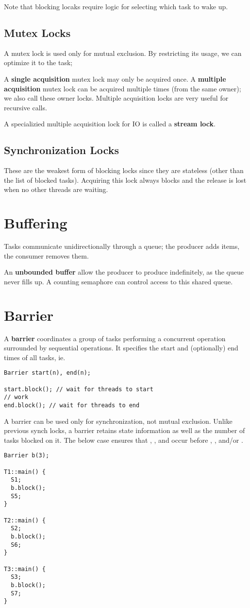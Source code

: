 \documentclass[12pt]{article}
\begin{document}
Note that blocking locaks require logic for selecting which task to wake up.

\subsection{Mutex Locks}
A mutex lock is used only for mutual exclusion. By restricting its usage, we can optimize it to the task;

A {\bf single acquisition} mutex lock may only be acquired once. A {\bf multiple acquisition} mutex lock can be acquired multiple times (from the same owner); we also call these owner locks. Multiple acquisition locks are very useful for recursive calls.

A specializied multiple acquisition lock for IO is called a {\bf stream lock}.

\subsection{Synchronization Locks}
These are the weakest form of blocking locks since they are stateless (other than the list of blocked tasks). Acquiring this lock always blocks and the release is lost when no other threads are waiting.

\section{Buffering}
Tasks communicate unidirectionally through a queue; the producer adds items, the consumer removes them.

An {\bf unbounded buffer} allow the producer to produce indefinitely, as the queue never fills up. A counting semaphore can control access to this shared queue.

\section{Barrier}
A {\bf barrier} coordinates a group of tasks performing a concurrent operation surrounded by sequential operations. It specifies the start and (optionally) end times of all tasks, ie.
\begin{verbatim}
Barrier start(n), end(n);

start.block(); // wait for threads to start
// work
end.block(); // wait for threads to end
\end{verbatim}

A barrier can be used only for synchronization, not mutual exclusion. Unlike previous synch locks, a barrier retains state information as well as the number of tasks blocked on it. The below case ensures that , , and  occur before , , and/or .
\begin{verbatim}
Barrier b(3);

T1::main() {
  S1;
  b.block();
  S5;
}

T2::main() {
  S2;
  b.block();
  S6;
}

T3::main() {
  S3;
  b.block();
  S7;
}
\end{verbatim}
\end{document}
